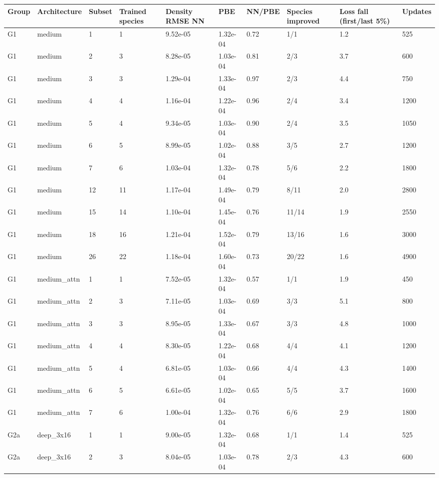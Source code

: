 \documentclass[10pt,a4paper]{article}
\begin{document}
\begin{landscape}
\begin{tiny}
\begin{longtable}{llllllllll}
\toprule Group & Architecture & Subset & Trained species & Density RMSE NN & PBE & NN/PBE & Species improved & Loss fall (first/last 5\%) & Updates \\ \midrule \endhead
G1 & medium & 1 & 1 & 9.52e-05 & 1.32e-04 & 0.72 & 1/1 & 1.2 & 525 \\
G1 & medium & 2 & 3 & 8.28e-05 & 1.03e-04 & 0.81 & 2/3 & 3.7 & 600 \\
G1 & medium & 3 & 3 & 1.29e-04 & 1.33e-04 & 0.97 & 2/3 & 4.4 & 750 \\
G1 & medium & 4 & 4 & 1.16e-04 & 1.22e-04 & 0.96 & 2/4 & 3.4 & 1200 \\
G1 & medium & 5 & 4 & 9.34e-05 & 1.03e-04 & 0.90 & 2/4 & 3.5 & 1050 \\
G1 & medium & 6 & 5 & 8.99e-05 & 1.02e-04 & 0.88 & 3/5 & 2.7 & 1200 \\
G1 & medium & 7 & 6 & 1.03e-04 & 1.32e-04 & 0.78 & 5/6 & 2.2 & 1800 \\
G1 & medium & 12 & 11 & 1.17e-04 & 1.49e-04 & 0.79 & 8/11 & 2.0 & 2800 \\
G1 & medium & 15 & 14 & 1.10e-04 & 1.45e-04 & 0.76 & 11/14 & 1.9 & 2550 \\
G1 & medium & 18 & 16 & 1.21e-04 & 1.52e-04 & 0.79 & 13/16 & 1.6 & 3000 \\
G1 & medium & 26 & 22 & 1.18e-04 & 1.60e-04 & 0.73 & 20/22 & 1.6 & 4900 \\
G1 & medium\_attn & 1 & 1 & 7.52e-05 & 1.32e-04 & 0.57 & 1/1 & 1.9 & 450 \\
G1 & medium\_attn & 2 & 3 & 7.11e-05 & 1.03e-04 & 0.69 & 3/3 & 5.1 & 800 \\
G1 & medium\_attn & 3 & 3 & 8.95e-05 & 1.33e-04 & 0.67 & 3/3 & 4.8 & 1000 \\
G1 & medium\_attn & 4 & 4 & 8.30e-05 & 1.22e-04 & 0.68 & 4/4 & 4.1 & 1200 \\
G1 & medium\_attn & 5 & 4 & 6.81e-05 & 1.03e-04 & 0.66 & 4/4 & 4.3 & 1400 \\
G1 & medium\_attn & 6 & 5 & 6.61e-05 & 1.02e-04 & 0.65 & 5/5 & 3.7 & 1600 \\
G1 & medium\_attn & 7 & 6 & 1.00e-04 & 1.32e-04 & 0.76 & 6/6 & 2.9 & 1800 \\
G2a & deep\_3x16 & 1 & 1 & 9.00e-05 & 1.32e-04 & 0.68 & 1/1 & 1.4 & 525 \\
G2a & deep\_3x16 & 2 & 3 & 8.04e-05 & 1.03e-04 & 0.78 & 2/3 & 4.3 & 600 \\

\end{longtable}
\end{tiny}
\end{landscape}
\end{document}
